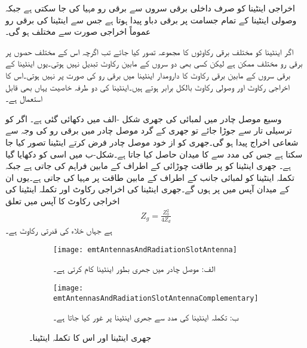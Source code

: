 اخراجی اینٹینا کو صرف داخلی برقی سروں سے برقی رو مہیا کی جا سکتی ہے جبکہ وصولی اینٹینا کے تمام جسامت پر برقی دباو پیدا ہوتا ہے جس سے اینٹینا کی برقی رو عموماً اخراجی صورت سے مختلف ہو گی۔

اگر اینٹینا کو مختلف برقی رکاوٹوں کا مجموعہ تصور کیا جائے تب اگرچہ اس کے مختلف حصوں پر برقی رو مختلف ممکن ہے لیکن کسی بھی دو سروں کے مابین رکاوٹ تبدیل نہیں ہوتی۔یوں اینٹینا کے برقی سروں کے مابین برقی رکاوٹ کا دارومدار اینٹینا میں برقی رو کی صورت پر نہیں ہوتی۔اس کا اخراجی رکاوٹ اور وصولی رکاوٹ بالکل برابر ہوتے ہیں۔اینٹینا کی دو طرفہ خاصیت یہاں بھی قابل استعمال ہے۔

وسیع موصل چادر میں  لمبائی کی جھری شکل -الف میں دکھائی گئی ہے۔ اگر  کو ترسیلی تار سے جوڑا جائے تو جھری کے گرد موصل چادر میں برقی رو کی وجہ سے شعاعی اخراج پیدا ہو گی۔جھری کو از خود موصل چادر فرض کرتے  اینٹینا تصور کیا جا سکتا ہے جس کی مدد سے   کا میدان حاصل کیا جاتا ہے۔شکل-ب میں اسی  کو دکھایا گیا ہے۔ جھری اینٹینا کو  پر طاقت چوڑائی کے اطراف کے مابین فراہم کی جاتی ہے جبکہ تکملہ اینٹینا کو لمبائی جانب کے اطراف کے مابین طاقت  پر مہیا کی جاتی ہے۔یوں ان کے میدان آپس میں  پر ہوں گے۔جھری اینٹینا کی اخراجی رکاوٹ  اور تکملہ اینٹینا کی اخراجی رکاوٹ  کا آپس میں تعلق
\begin{align}
Z_g = \frac{Z_0^2}{4 Z_{d}}
\end{align}
ہے جہاں  خلاء کی قدرتی رکاوٹ ہے۔

\begin{figure}
\centering
\begin{subfigure}{0.5\textwidth}
\centering
\texttt{[image: emtAntennasAndRadiationSlotAntenna]}
\caption*{الف: موصل چادر میں جھری بطور اینٹینا کام کرتی ہے۔}
\end{subfigure}%
%
\begin{subfigure}{0.5\textwidth}
\centering
\texttt{[image: emtAntennasAndRadiationSlotAntennaComplementary]}
\caption*{ب: تکملہ اینٹینا کی مدد سے جھری اینٹینا پر غور کیا جاتا ہے۔}
\end{subfigure}%
\caption{جھری اینٹینا اور اس کا تکملہ اینٹینا۔}
\label{شکل_اینٹینا_جھری_اینٹینا}
\end{figure}

